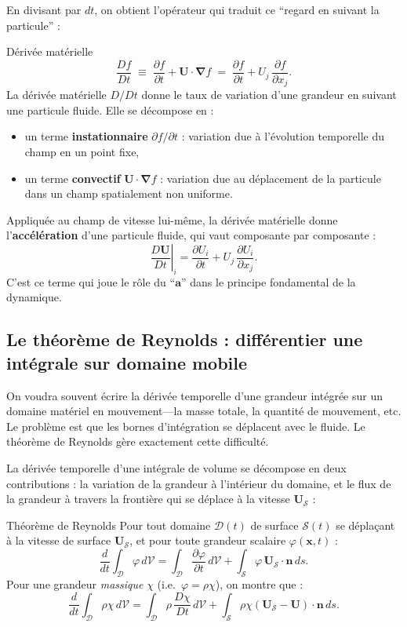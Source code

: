 \documentclass[11pt,a4paper]{report}
\newcommand{\pd}[2]{\dfrac{\partial #1}{\partial #2}}
\begin{document}
En divisant par $dt$, on obtient l'opérateur qui traduit ce ``regard en suivant
la particule'' :

\begin{importantbox}{Dérivée matérielle}
\[
    \frac{Df}{Dt} \;\equiv\; \pd{f}{t} + \bm{U}\cdot\boldsymbol{\nabla}f
    \;=\; \pd{f}{t} + U_j\,\pd{f}{x_j}.
\]
La dérivée matérielle $D/Dt$ donne le taux de variation d'une grandeur en suivant
une particule fluide. Elle se décompose en :
\begin{itemize}
    \item un terme \textbf{instationnaire} $\partial f/\partial t$ : variation due
    à l'évolution temporelle du champ en un point fixe,
    \item un terme \textbf{convectif} $\bm{U}\cdot\boldsymbol{\nabla}f$ : variation
    due au déplacement de la particule dans un champ spatialement non uniforme.
\end{itemize}
\end{importantbox}

Appliquée au champ de vitesse lui-même, la dérivée matérielle donne
l'\textbf{accélération} d'une particule fluide, qui vaut composante par composante :
\[
    \left.\frac{D\bm{U}}{Dt}\right|_i = \pd{U_i}{t} + U_j\,\pd{U_i}{x_j}.
\]
C'est ce terme qui joue le rôle du ``$\bm{a}$'' dans le principe fondamental de la
dynamique.

\subsection{Le théorème de Reynolds : différentier une intégrale sur domaine mobile}

On voudra souvent écrire la dérivée temporelle d'une grandeur intégrée sur un
domaine matériel en mouvement---la masse totale, la quantité de mouvement, etc. Le
problème est que les bornes d'intégration se déplacent avec le fluide. Le théorème
de Reynolds gère exactement cette difficulté.

La dérivée temporelle d'une intégrale de volume se décompose en deux contributions :
la variation de la grandeur à l'intérieur du domaine, et le flux de la grandeur à
travers la frontière qui se déplace à la vitesse $\bm{U}_\mathcal{S}$ :

\begin{importantbox}{Théorème de Reynolds}
Pour tout domaine $\mathcal{D}(t)$ de surface $\mathcal{S}(t)$ se déplaçant à la
vitesse de surface $\bm{U}_\mathcal{S}$, et pour toute grandeur scalaire
$\varphi(\bm{x},t)$ :
\[
    \frac{d}{dt}\int_{\mathcal{D}} \varphi\,d\mathcal{V}
    = \int_{\mathcal{D}} \pd{\varphi}{t}\,d\mathcal{V}
    + \int_{\mathcal{S}} \varphi\,\bm{U}_\mathcal{S}\cdot\bm{n}\,ds.
\]
Pour une grandeur \emph{massique} $\chi$ (i.e.\ $\varphi = \rho\chi$), on montre
que :
\[
    \frac{d}{dt}\int_{\mathcal{D}} \rho\chi\,d\mathcal{V}
    = \int_{\mathcal{D}} \rho\,\frac{D\chi}{Dt}\,d\mathcal{V}
    + \int_{\mathcal{S}} \rho\chi(\bm{U}_\mathcal{S}-\bm{U})\cdot\bm{n}\,ds.
\]
\end{importantbox}
\end{document}

